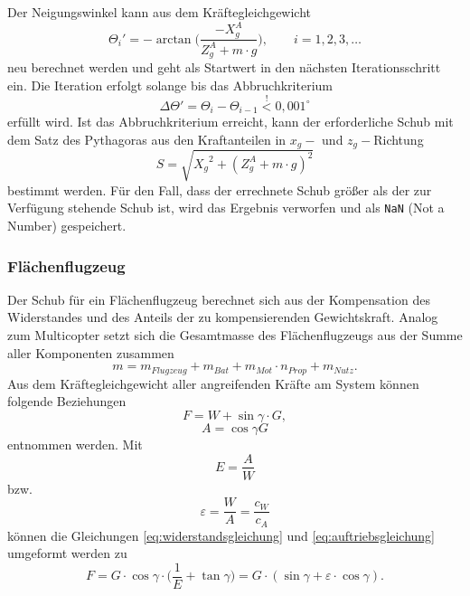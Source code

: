 Der Neigungswinkel kann aus dem Kräftegleichgewicht
\begin{equation}
	\Theta_i' = -\arctan\Big(\frac{-X_g^A}{Z_g^A + m\cdot g}\Big), \qquad i =1,2,3,\dots
\end{equation}
neu berechnet werden und geht als Startwert in den nächsten Iterationsschritt ein. Die Iteration erfolgt solange bis das Abbruchkriterium
\begin{equation}
	\Delta\Theta' = \Theta_i-\Theta_{i-1}\stackrel{!}{<}0,001^{\circ}
\end{equation}
erfüllt wird. 
Ist das Abbruchkriterium erreicht, kann der erforderliche Schub mit dem Satz des Pythagoras aus den Kraftanteilen in \(x_g-\) und \(z_g-\)Richtung
\begin{equation}
	S = \sqrt{{X_g}^2+(Z_g^A+m\cdot g)^2}
\end{equation}
bestimmt werden.
Für den Fall, dass der errechnete Schub größer als der zur Verfügung stehende Schub ist, wird das Ergebnis verworfen und als \texttt{NaN} (Not a Number) gespeichert.

\subsubsection{Flächenflugzeug}
Der Schub für ein Flächenflugzeug berechnet sich aus der Kompensation des Widerstandes und des Anteils der zu kompensierenden Gewichtskraft. Analog zum Multicopter setzt sich die Gesamtmasse des Flächenflugzeugs aus der Summe aller Komponenten zusammen
\begin{equation}
	m = m_{Flugzeug}+m_{Bat}+m_{Mot}\cdot n_{Prop}+m_{Nutz}.
\end{equation}
Aus dem Kräftegleichgewicht aller angreifenden Kräfte am System können folgende Beziehungen 
\begin{equation}
	F = W + \sin\gamma\cdot G, \label{eq:widerstandsgleichung}
\end{equation}
\begin{equation}
	A = \cos\gamma G \label{eq:auftriebsgleichung}
\end{equation}
entnommen werden.
Mit
\begin{equation}
	E = \frac{A}{W}
\end{equation}
bzw.
\begin{equation}
	\varepsilon = \frac{W}{A} = \frac{c_W}{c_A}
\end{equation} 
können die Gleichungen \eqref{eq:widerstandsgleichung} und \eqref{eq:auftriebsgleichung} umgeformt werden zu
\begin{equation}
	F = G\cdot\cos\gamma\cdot\Big(\frac{1}{E}+\tan\gamma\Big) = G\cdot(\sin\gamma+\varepsilon\cdot\cos\gamma).
\end{equation}



